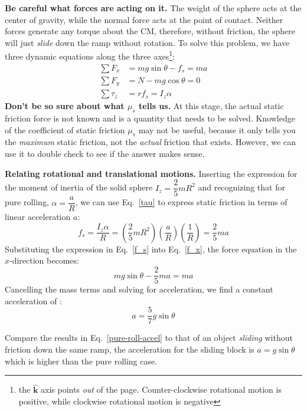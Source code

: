 \documentclass{../../../oss-handout}
\newcommand{\kkk}{\hat{\bm{k}}}
\begin{document}
\textbf{Be careful what forces are acting on it.} The weight of the sphere acts
at the center of gravity, while the normal force acts at the point of contact.
Neither forces generate any torque about the CM, therefore, without friction,
the sphere will just \emph{slide} down the ramp without rotation. To solve this
problem, we have three dynamic equations along the three
axes\footnote{the $\kkk$ axis points \emph{out} of the page. Counter-clockwise
  rotational motion is positive, while clockwise rotational motion is negative}:
\begin{align}
  \sum F_x&=mg\sin\theta-f_s=ma\\ \label{f_x}
  \sum F_y&=N-mg\cos\theta=0\\
  \sum\tau_z&=rf_s=I_z\alpha \label{tau}
\end{align}
\textbf{Don't be so sure about what $\mu_s$ tells us.} At this stage, the
actual static friction force is not known and is a quantity that needs to be
solved. Knowledge of the coefficient of static friction $\mu_s$ may not be
useful, because it only tells you the \emph{maximum} static friction, not the
\emph{actual} friction that exists. However, we can use it to double check to
see if the answer makes sense.

\textbf{Relating rotational and translational motions.} Inserting the
expression for the moment of inertia of the solid sphere $I_z=\dfrac25 mR^2$
and recognizing that for pure rolling, $\alpha=\dfrac aR$, we can use
Eq.~\ref{tau} to express static friction in terms of linear acceleration $a$:
\begin{equation}
  f_s=\frac{I_z\alpha}{R}=
  \left(\frac25 mR^2\right)
  \left(\frac{a}{R}\right)
  \left(\frac{1}{R}\right)=\frac25ma
  \label{f_s}
\end{equation}
Substituting the expression in Eq.~\ref{f_s} into Eq.~\ref{f_x}, the force
equation in the $x$-direction becomes:
\begin{equation}
  mg\sin\theta-\frac25 ma=ma
\end{equation}
Cancelling the mass terms and solving for acceleration, we find a constant
acceleration of :
\begin{equation}
  a=\frac57 g\sin\theta
  \label{pure-roll-accel}
\end{equation}

Compare the results in Eq.~\ref{pure-roll-accel} to that of an object
\emph{sliding} without friction down the same ramp, the acceleration for the
sliding block is $a=g\sin\theta$ which is higher than the pure rolling case.
\end{document}
